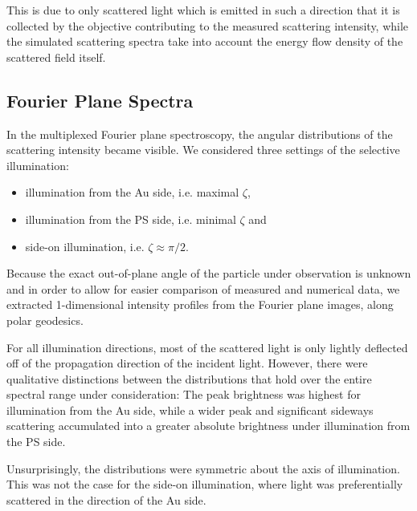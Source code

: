 \documentclass[10pt]{article}
\begin{document}
This is due to only scattered light which is emitted in such a direction that it is collected by the objective contributing to the measured scattering intensity, while the simulated scattering spectra take into account the energy flow density of the scattered field itself. 






\subsection*{Fourier Plane Spectra}

In the multiplexed Fourier plane spectroscopy, the angular distributions of the scattering intensity became visible. 
We considered three settings of the selective illumination: 
\begin{itemize}
    \item illumination from the Au side, i.e. maximal $\zeta$,
    \item illumination from the PS side, i.e. minimal $\zeta$ and
    \item side-on illumination, i.e. $\zeta \approx \pi/2$.
\end{itemize}

Because the exact out-of-plane angle of the particle under observation is unknown and in order to allow for easier comparison of measured and numerical data, we extracted 1-dimensional intensity profiles from the Fourier plane images, along polar geodesics. 

For all illumination directions, most of the scattered light is only lightly deflected off of the propagation direction of the incident light. 
However, there were qualitative distinctions between the distributions that hold over the entire spectral range under consideration:
The peak brightness was highest for illumination from the Au side, while a wider peak and significant sideways scattering accumulated into a greater absolute brightness under illumination from the PS side. 

Unsurprisingly, the distributions were symmetric about the axis of illumination. 
This was not the case for the side-on illumination, where light was preferentially scattered in the direction of the Au side. 




\end{document}
